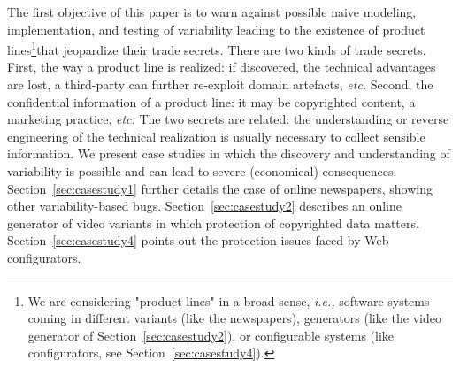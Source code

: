 \documentclass{sig-alternate}
\newcommand{\ie}{\emph{i.e.,}\xspace}
\newcommand{\etc}{\emph{etc.}\xspace}
\begin{document}
 The first objective of this paper is to warn against possible naive modeling, implementation, and testing of variability leading to the existence of product lines\footnote{We are considering "product lines" in a broad sense, \ie software systems coming in different variants (like the newspapers), generators (like the video generator of Section~\ref{sec:casestudy2}), or configurable systems (like configurators, see Section~\ref{sec:casestudy4}).}\fi that jeopardize their trade secrets.
 There are two kinds of trade secrets. First, the way a product line is realized: if discovered, the technical advantages are lost, a third-party can further re-exploit domain artefacts, \etc Second, the confidential information of a product line: it may be copyrighted content, a marketing practice, \etc The two secrets are related: the understanding or reverse engineering of the technical realization is usually necessary to collect sensible information.
% 
 We present case studies in which the discovery and understanding of variability is possible and can lead to severe (economical) consequences.
 Section~\ref{sec:casestudy1} further details the case of online newspapers, showing other variability-based bugs.
 Section~\ref{sec:casestudy2} describes an online generator of video variants in which protection of copyrighted data matters.
 Section~\ref{sec:casestudy4} points out the protection issues faced by Web configurators.



\end{document}
